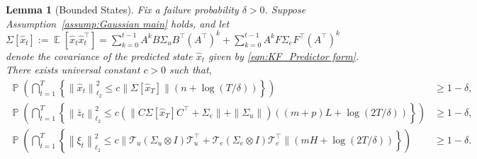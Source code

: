 \documentclass[11pt]{article}
\newtheorem{lemma}{Lemma}
\newcommand{\zbar}{\bar{z}}
\newcommand{\xtil}{\hat{x}}
\newcommand{\Tcal}{\mathcal{T}}
\newcommand{\tn}[1]{\left\|{#1}\right\|_{\ell_2}}
\newcommand{\nn}{\nonumber}
\newcommand{\E}{\operatorname{\mathbb{E}}}
\renewcommand{\P}{\operatorname{\mathbb{P}}}
\newcommand{\norm}[1]{\|{#1} \|}
\newcommand{\T}{\top}
\newcommand{\<}{\langle}
\renewcommand{\>}{\rangle}
\renewcommand{\P}{\operatorname{\mathbb{P}}}
\numberwithin{equation}{section}
\begin{document}
\begin{lemma}[Bounded States]\label{lemma:bounded_states}
Fix a failure probability $\delta >0$. Suppose Assumption~\ref{assump:Gaussian main} holds, and let $\Sigma[\xtil_t] := \E\left[\xtil_t \xtil_t^\T\right] = \sum_{k=0}^{t-1} A^k B \Sigma_u B^\T (A^\T)^k + \sum_{k=0}^{t-1} A^k F \Sigma_e F^\T (A^\T)^k$ denote the covariance of the predicted state $\xtil_t$ given by \eqref{eqn:KF_Predictor form}. There exists universal constant $c>0$ such that,
\begin{align}
    \P\left(\bigcap_{t=1}^T\left\{\tn{\xtil_t}^2 \leq c \norm{\Sigma[\xtil_T]} \left(n + \log (T/\delta)\right)\right\}\right) &\geq 1 - \delta, \nn \\
    \P\left(\bigcap_{t=1}^T\left\{\tn{\zbar_t}^2 \leq c (\norm{C\Sigma[\xtil_T]C^\T + \Sigma_e} + \norm{\Sigma_u}) \left( (m+p)L + \log (2T/\delta)\right)\right\}\right) &\geq 1 - \delta, \nn \\
    \P\left(\bigcap_{t=1}^T\left\{\tn{\xi_t}^2 \leq c\norm{\Tcal_u(\Sigma_u \otimes I)\Tcal_u^\T +\Tcal_e(\Sigma_e \otimes I)\Tcal_e^\T} \left(mH + \log (2T/\delta)\right)\right\}\right) &\geq 1 - \delta.
\end{align}
\end{lemma}
\end{document}
